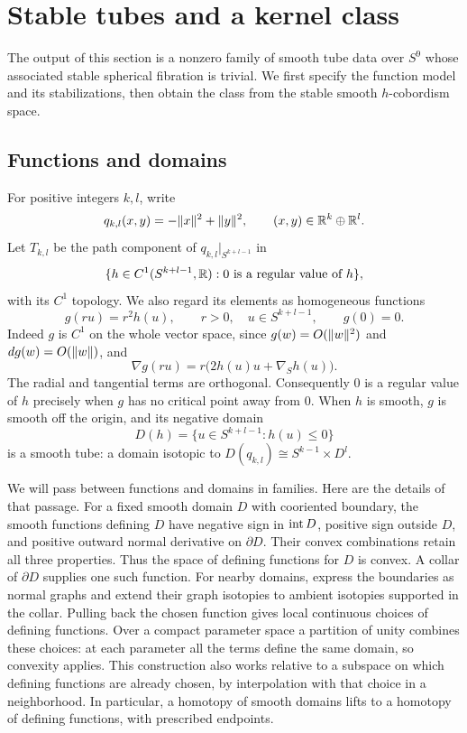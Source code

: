 \section{Stable tubes and a kernel class}\label{sec:tubes}

The output of this section is a nonzero family of smooth tube data over
$S^9$ whose associated stable spherical fibration is trivial. We first
specify the function model and its stabilizations, then obtain the class
from the stable smooth $h$-cobordism space.

\subsection{Functions and domains}

For positive integers $k,l$, write
\[
 q_{k,l}(x,y)=-\lVert x\rVert^{2}+\lVert y\rVert^{2},
 \qquad (x,y)\in\mathbb R^k\oplus\mathbb R^l.
\]
Let $T_{k,l}$ be the path component of $q_{k,l}|_{S^{k+l-1}}$ in
\[
 \{h\in C^1(S^{k+l-1},\mathbb R):0\text{ is a regular value of }h\},
\]
with its $C^1$ topology. We also regard its elements as homogeneous functions
\begin{equation}\label{eq:homogeneous-extension}
 g(ru)=r^2h(u),\qquad r>0,\quad u\in S^{k+l-1},\qquad g(0)=0.
\end{equation}
Indeed $g$ is $C^1$ on the whole vector space, since $g(w)=O(\lVert w\rVert^2)$
and $dg(w)=O(\lVert w\rVert)$, and
\begin{equation}\label{eq:angular-gradient}
 \nabla g(ru)=r\bigl(2h(u)u+\nabla_Sh(u)\bigr).
\end{equation}
The radial and tangential terms are orthogonal. Consequently $0$ is a
regular value of $h$ precisely when $g$ has no critical point away from $0$.
When $h$ is smooth, $g$ is smooth off the origin, and its negative domain
\[
 D(h)=\{u\in S^{k+l-1}:h(u)\leq0\}
\]
is a smooth tube: a domain isotopic to
$D(q_{k,l})\cong S^{k-1}\times D^l$.

We will pass between functions and domains in families. Here are the
details of that passage. For a fixed smooth domain $D$ with cooriented
boundary, the smooth functions defining $D$ have negative sign in
$\operatorname{int} D$, positive sign outside $D$, and positive outward normal derivative
on $\partial D$. Their convex combinations retain all three properties.
Thus the space of defining functions for $D$ is convex. A collar of
$\partial D$ supplies one such function. For nearby domains, express the
boundaries as normal graphs and extend their graph isotopies to ambient
isotopies supported in the collar. Pulling back the chosen function gives
local continuous choices of defining functions. Over a compact parameter
space a partition of unity combines these choices: at each parameter all
the terms define the same domain, so convexity applies. This construction
also works relative to a subspace on which defining functions are already
chosen, by interpolation with that choice in a neighborhood. In particular,
a homotopy of smooth domains lifts to a homotopy of defining functions,
with prescribed endpoints.

